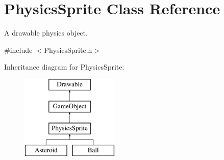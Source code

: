 \hypertarget{class_physics_sprite}{\section{Physics\+Sprite Class Reference}
\label{class_physics_sprite}
}


A drawable physics object.  




{\ttfamily \#include $<$Physics\+Sprite.\+h$>$}

Inheritance diagram for Physics\+Sprite\+:\begin{figure}[H]
\begin{center}
\leavevmode
\includegraphics[height=4.000000cm]{class_physics_sprite}
\end{center}
\end{figure}
